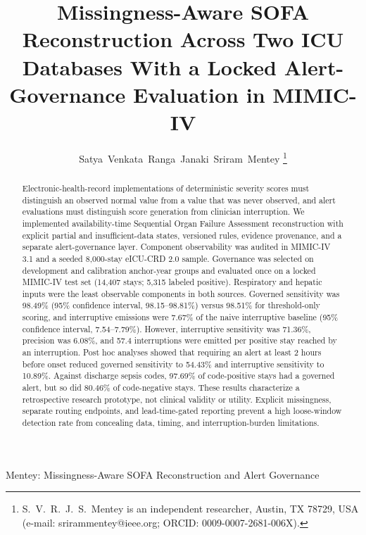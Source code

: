 \documentclass[journal]{IEEEtran}
\begin{document}
\title{Missingness-Aware SOFA Reconstruction Across Two ICU Databases
With a Locked Alert-Governance Evaluation in MIMIC-IV}

\author{Satya~Venkata~Ranga~Janaki~Sriram~Mentey
\thanks{S.~V.~R.~J.~S.~Mentey is an independent researcher, Austin, TX 78729, USA
(e-mail: srirammentey@ieee.org; ORCID: 0009-0007-2681-006X).}}

{Mentey: Missingness-Aware SOFA Reconstruction and Alert Governance}

\maketitle

\begin{abstract}
Electronic-health-record implementations of deterministic severity scores
must distinguish an observed normal value from a value that was never
observed, and alert evaluations must distinguish score generation from
clinician interruption. We implemented availability-time Sequential Organ Failure Assessment
reconstruction
with explicit partial and insufficient-data states, versioned rules, evidence
provenance, and a separate alert-governance layer. Component observability was
audited in MIMIC-IV 3.1 and a seeded 8,000-stay eICU-CRD 2.0 sample.
Governance was selected on development and calibration anchor-year groups and
evaluated once on a locked MIMIC-IV test set (14,407 stays; 5,315 labeled
positive). Respiratory and hepatic inputs were the least observable components
in both sources. Governed sensitivity was 98.49\% (95\% confidence interval,
98.15--98.81\%)
versus 98.51\% for threshold-only scoring, and interruptive emissions were
7.67\% of the naive interruptive baseline (95\% confidence interval, 7.54--7.79\%). However,
interruptive sensitivity was 71.36\%, precision was 6.08\%, and 57.4
interruptions were emitted per positive stay reached by an interruption. Post hoc analyses
showed that requiring an alert at least 2 hours before onset reduced governed
sensitivity to 54.43\% and interruptive sensitivity to 10.89\%. Against
discharge sepsis codes, 97.69\% of code-positive stays had a governed alert,
but so did 80.46\% of code-negative stays. These results characterize a
retrospective research prototype, not clinical validity or utility. Explicit
missingness, separate routing endpoints, and lead-time-gated reporting prevent
a high loose-window detection rate from concealing data, timing, and
interruption-burden limitations.
\end{abstract}
\end{document}
